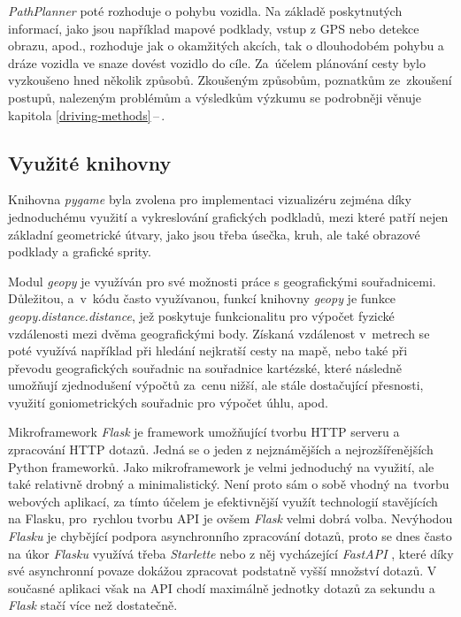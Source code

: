 \documentclass[czech, bachelor]{diploma}
\newcommand{\peteref}[1]{\ref{#1}\,--\,\nameref{#1}}
\begin{document}
\emph{PathPlanner} poté rozhoduje o pohybu vozidla. Na základě poskytnutých informací, jako jsou například mapové podklady, vstup
z GPS nebo detekce obrazu, apod., rozhoduje jak o okamžitých akcích, tak o dlouhodobém pohybu a dráze vozidla ve snaze dovést
vozidlo do cíle. Za~účelem plánování cesty bylo vyzkoušeno hned několik způsobů. Zkoušeným způsobům, poznatkům ze~zkoušení
postupů, nalezeným problémům a výsledkům výzkumu se podrobněji věnuje kapitola \peteref{driving-methods}.

\subsection{Využité knihovny}

Knihovna \emph{pygame} \cite{pygame-source} byla zvolena pro implementaci vizualizéru zejména díky jednoduchému využití a
vykreslování grafických podkladů, mezi které patří nejen základní geometrické útvary, jako jsou třeba úsečka, kruh, ale také
obrazové podklady a grafické sprity.

Modul \emph{geopy} \cite{geopy-source} je využíván pro své možnosti práce s geografickými souřadnicemi. Důležitou, a~v~kódu často
využívanou, funkcí knihovny \emph{geopy} je funkce \emph{geopy.distance.distance}, jež poskytuje funkcionalitu pro výpočet fyzické
vzdálenosti mezi dvěma geografickými body. Získaná vzdálenost v~metrech se poté využívá například při hledání nejkratší cesty
na mapě, nebo také při převodu geografických souřadnic na souřadnice kartézské, které následně umožňují zjednodušení výpočtů
za~cenu nižší, ale stále dostačující přesnosti, využití goniometrických souřadnic pro výpočet úhlu, apod.

Mikroframework \emph{Flask} \cite{flask-source} je framework umožňující tvorbu HTTP serveru a zpracování HTTP dotazů. Jedná
se o jeden z nejznámějších a nejrozšířenějších Python frameworků. Jako mikroframework je velmi jednoduchý na využití, ale také
relativně drobný a minimalistický. Není proto sám o sobě vhodný na~tvorbu webových aplikací, za tímto účelem je efektivnější
využít technologií stavějících na Flasku, pro~rychlou tvorbu API je ovšem \emph{Flask} velmi dobrá volba. Nevýhodou \emph{Flasku}
je chybějící podpora asynchronního zpracování dotazů, proto se dnes často na úkor \emph{Flasku} využívá třeba \emph{Starlette}
\cite{starlette-source} nebo z něj vycházející \emph{FastAPI} \cite{fastapi-source}, které díky své asynchronní povaze dokážou 
zpracovat podstatně vyšší množství dotazů. V současné aplikaci však na API chodí maximálně jednotky dotazů za sekundu a 
\emph{Flask} stačí více než dostatečně.
\end{document}
